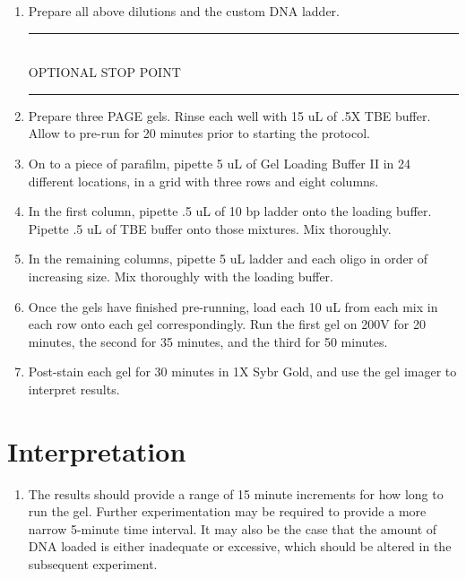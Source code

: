 \documentclass[letterpaper]{article}
\newcommand{\stopPoint}{\begin{center}
\rule{0.5\textwidth}{.4pt}\\
\vspace{1mm} 
OPTIONAL STOP POINT\\
\rule{0.5\textwidth}{.4pt}
\end{center}}
\begin{document}
\begin{enumerate} %
\item{Prepare all above dilutions and the custom DNA ladder.}
\stopPoint
\item{Prepare three PAGE gels. Rinse each well with 15 uL of .5X TBE buffer. Allow to pre-run for 20 minutes prior to starting the protocol.} %
\item{On to a piece of parafilm, pipette 5 uL of Gel Loading Buffer II in 24 different locations, in a grid with three rows and eight columns.}
\item{In the first column, pipette .5 uL of 10 bp ladder onto the loading buffer. Pipette .5 uL of TBE buffer onto those mixtures. Mix thoroughly.}
\item{In the remaining columns, pipette 5 uL ladder and each oligo in order of increasing size. Mix thoroughly with the loading buffer.}
\item{Once the gels have finished pre-running, load each 10 uL from each mix in each row onto each gel correspondingly. Run the first gel on 200V for 20 minutes, the second for 35 minutes, and the third for 50 minutes.}
\item{Post-stain each gel for 30 minutes in 1X Sybr Gold, and use the gel imager to interpret results.}
\end{enumerate}

\section{Interpretation}%

\begin{enumerate}
\item{The results should provide a range of 15 minute increments for how long to run the gel. Further experimentation may be required to provide a more narrow 5-minute time interval. It may also be the case that the amount of DNA loaded is either inadequate or excessive, which should be altered in the subsequent experiment.}
\end{enumerate}
\end{document}
